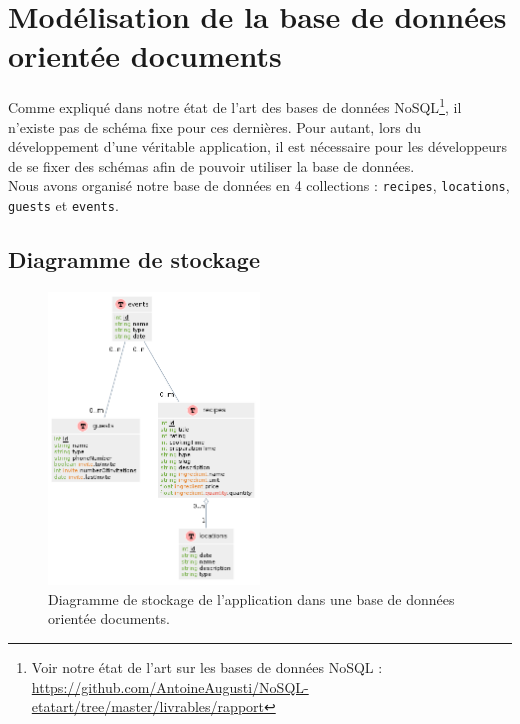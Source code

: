 

\section{Modélisation de la base de données orientée documents}%
\label{sec:modelisation}

	Comme expliqué dans notre état de l'art des bases de données NoSQL\footnote{Voir notre état de l'art sur les bases de données NoSQL : \url{https://github.com/AntoineAugusti/NoSQL-etatart/tree/master/livrables/rapport}}, il n'existe pas de schéma fixe pour ces dernières. Pour autant, lors du développement d'une véritable application, il est nécessaire pour les développeurs de se fixer des schémas afin de pouvoir utiliser la base de données.\\

	Nous avons organisé notre base de données en 4 collections : \verb|recipes|, \verb|locations|, \verb|guests| et \verb|events|.

	\subsection{Diagramme de stockage}

		\begin{figure}[H]
			\centering
			\includegraphics[width=0.5\textwidth]{images/diagramme-stockage.png}
			\caption{Diagramme de stockage de l'application dans une base de données orientée documents.}
			\label{fig:diagramme-stockage}
		\end{figure}

